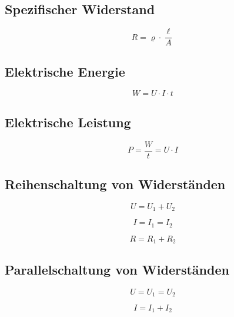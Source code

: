 \subsection{Spezifischer Widerstand}
\begin{equation}\label{eq:spezifischer:widerstand}
R = \varrho\cdot\frac{\ell}{A}
\end{equation}

\subsection{Elektrische Energie}
\begin{equation}\label{eq:elektrische:energie}
W = U \cdot I \cdot t
\end{equation}

\subsection{Elektrische Leistung}
\begin{equation}\label{eq:elektrische:leistung}
P = \frac{W}{t} = U \cdot I
\end{equation}

\subsection{Reihenschaltung von Widerständen}
\begin{equation}\label{eq:widerstand:reihenschaltung:spannung}
U = U_1 + U_2 
\end{equation}

\begin{equation}\label{eq:widerstand:reihenschaltung:strom}
I = I_1 = I_2
\end{equation}

\begin{equation}\label{eq:widerstand:reihenschaltung:widerstand}
R = R_1 + R_2
\end{equation}

\subsection{Parallelschaltung von Widerständen}
\begin{equation}\label{eq:widerstand:parallelschaltung:spannung}
U = U_1 = U_2
\end{equation}

\begin{equation}\label{eq:widerstand:parallelschaltung:strom}
I = I_1 + I_2
\end{equation}

